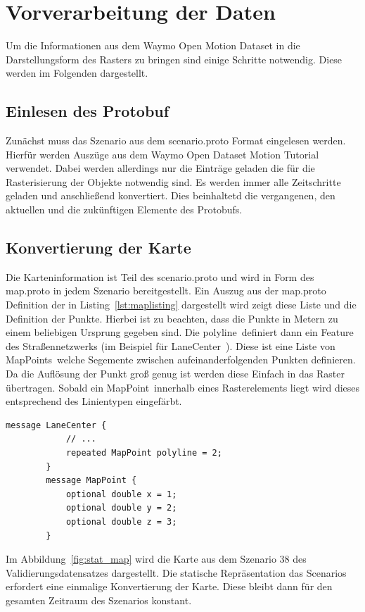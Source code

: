 \documentclass[12pt]{article}
\begin{document}
\section{Vorverarbeitung der Daten}
\label{sec:preprocessing}
    Um die Informationen aus dem Waymo Open Motion Dataset in die Darstellungsform des Rasters zu bringen 
    sind einige Schritte notwendig. Diese werden im Folgenden dargestellt. 
    \subsection{Einlesen des Protobuf} 
        Zunächst muss das Szenario aus dem scenario.proto Format eingelesen werden. 
        Hierfür werden Auszüge aus dem Waymo Open Dataset Motion Tutorial~\cite{Tutorial2021} verwendet. 
        Dabei werden allerdings nur die Einträge geladen die für die Rasterisierung der Objekte notwendig sind. 
        Es werden immer alle Zeitschritte geladen und anschließend konvertiert. 
        Dies beinhaltetd die vergangenen, den aktuellen und die zukünftigen Elemente des Protobufs.
    
    \pagebreak
    \subsection{Konvertierung der Karte}
        Die Karteninformation ist Teil des scenario.proto und wird in Form des map.proto in jedem Szenario bereitgestellt.
        Ein Auszug aus der map.proto Definition der in Listing~\ref{lst:maplisting} dargestellt wird zeigt diese Liste und die Definition der Punkte. 
        Hierbei ist zu beachten, dass die Punkte in Metern zu einem beliebigen Ursprung gegeben sind. 
        Die \grqq polyline\grqq~definiert dann ein Feature des Straßennetzwerks (im Beispiel für \grqq LaneCenter\grqq~). Diese ist eine Liste von \grqq MapPoints\grqq~welche Segemente zwischen aufeinanderfolgenden Punkten definieren.
        Da die Auflösung der Punkt groß genug ist werden diese Einfach in das Raster übertragen. 
        Sobald ein \grqq MapPoint\grqq~innerhalb eines Rasterelements liegt wird dieses entsprechend des Linientypen eingefärbt.
        \vspace{0.5cm}
        \begin{lstlisting}[language=protobuf2, caption=Auszug aus map.proto, label={lst:maplisting}]
        message LaneCenter {
            // ...
            repeated MapPoint polyline = 2;
        }
        message MapPoint {
            optional double x = 1;
            optional double y = 2;
            optional double z = 3;
        }
        \end{lstlisting}
        Im Abbildung~\ref{fig:stat_map} wird die Karte aus dem Szenario 38 des Validierungsdatensatzes dargestellt. 
        Die statische Repräsentation das Scenarios erfordert eine einmalige Konvertierung der Karte. 
        Diese bleibt dann für den gesamten Zeitraum des Szenarios konstant.
\end{document}
